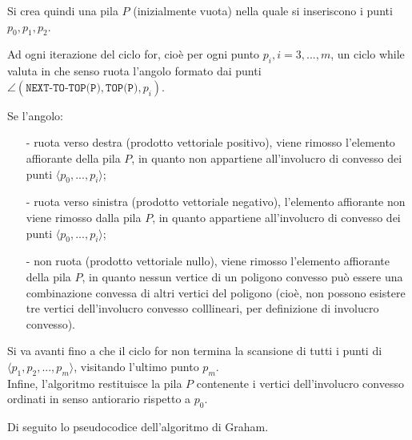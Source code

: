 \documentclass[12pt,a4paper]{report}
\begin{document}
\vspace{0.5cm}

Si crea quindi una pila $P$ (inizialmente vuota) nella quale si inseriscono i punti $p_0, p_1, p_2$.

\vspace{0.5cm}

Ad ogni iterazione del ciclo for, cioè per ogni punto $p_i, i = 3, ..., m$, un ciclo while valuta in che senso ruota l'angolo formato dai punti $\angle (\texttt{NEXT-TO-TOP(P)}, \texttt{TOP(P)}, p_i)$.

Se l'angolo:
\begin{itemize}
    \item[-] ruota verso destra (prodotto vettoriale positivo), viene rimosso l'elemento affiorante della pila $P$, in quanto non appartiene all'involucro di convesso dei punti $\langle p_0, ..., p_i \rangle$;
    \item[-] ruota verso sinistra (prodotto vettoriale negativo), l'elemento affiorante non viene rimosso dalla pila $P$, in quanto appartiene all'involucro di convesso dei punti $\langle p_0, ..., p_i \rangle$;
    \item[-] non ruota (prodotto vettoriale nullo), viene rimosso l'elemento affiorante della pila $P$, in quanto nessun vertice di un poligono convesso può essere una combinazione convessa di altri vertici del poligono (cioè, non possono esistere tre vertici dell'involucro convesso colllineari, per definizione di involucro convesso).
\end{itemize}

Si va avanti fino a che il ciclo for non termina la scansione di tutti i punti di $\langle p_1, p_2, ..., p_m \rangle$, visitando l'ultimo punto $p_m$.\\
Infine, l'algoritmo restituisce la pila $P$ contenente i vertici dell'involucro convesso ordinati in senso antiorario rispetto a $p_0$.

\pagebreak

Di seguito lo pseudocodice dell'algoritmo di Graham.
\end{document}
